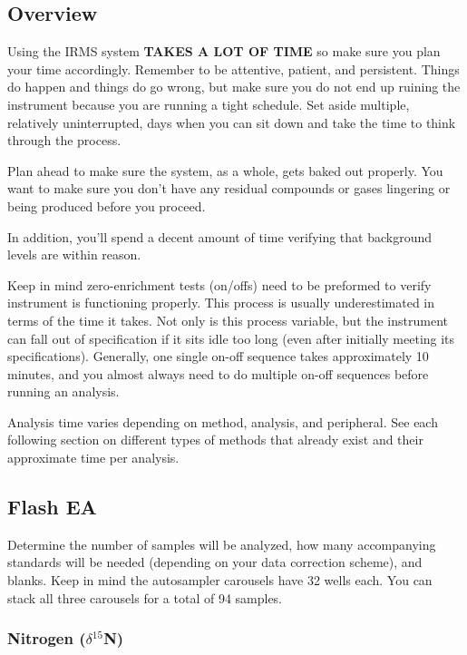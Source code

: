 \documentclass[12pt]{../SOP4_alpha}\usepackage[]{graphicx}\usepackage[]{color}
\begin{document}
\subsection{Overview}

\NP Using the IRMS system \textbf{TAKES A LOT OF TIME} so make sure you plan your time accordingly. Remember to be attentive, patient, and persistent. Things do happen and things do go wrong, but make sure you do not end up ruining the instrument because you are running a tight schedule. Set aside multiple, relatively uninterrupted, days when you can sit down and take the time to think through the process.

\NP Plan ahead to make sure the system, as a whole, gets baked out properly. You want to make sure you don't have any residual compounds or gases lingering or being produced before you proceed.

\NP In addition, you'll spend a decent amount of time verifying that background levels are within reason. 

\NP Keep in mind zero-enrichment tests (on/offs) need to be preformed to verify instrument is functioning properly. This process is usually underestimated in terms of the time it takes. Not only is this process variable, but the instrument can fall out of specification if it sits idle too long (even after initially meeting its specifications). Generally, one single on-off sequence takes approximately 10 minutes, and you almost always need to do multiple on-off sequences before running an analysis.

\NP Analysis time varies depending on method, analysis, and peripheral. See each following section on different types of methods that already exist and their approximate time per analysis.

\subsection{Flash EA}

\NP Determine the number of samples will be analyzed, how many accompanying standards will be needed (depending on your data correction scheme), and blanks. Keep in mind the autosampler carousels have 32 wells each. You can stack all three carousels for a total of 94 samples.

\subsubsection{Nitrogen ($\delta$$^{15}$N)}
\end{document}
